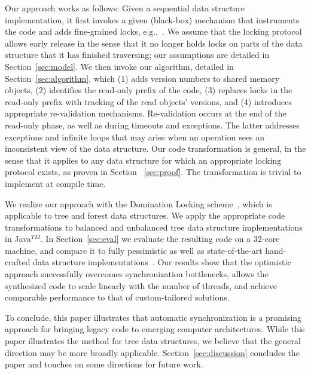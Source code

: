 Our approach works as follows: Given a sequential data structure implementation, 
it first invokes a given (black-box) mechanism that instruments the code and adds  
fine-grained locks, e.g.,~\cite{domination,tree-locking,dag}. We assume that the locking protocol 
allows early release in the sense that it no longer holds locks on parts of the data structure that it has finished traversing; 
our assumptions are detailed in Section~\ref{sec:model}. We then invoke our algorithm, detailed in Section~\ref{sec:algorithm}, which 
(1) adds version numbers to shared memory objects, 
(2) identifies the read-only prefix of the code, 
(3) replaces locks in the read-only prefix with tracking of the read objects' versions, and 
(4) introduces appropriate re-validation mechanisms.  
Re-validation occurs at the end of the read-only phase, as well as during timeouts and exceptions. 
The latter addresses exceptions and infinite loops that may arise when an operation sees an inconsistent view of the data structure. 
Our code transformation is general, in the sense that it applies to any data structure for which an appropriate locking protocol exists, 
as proven in Section ~\ref{sec:proof}. The transformation is trivial to implement at compile time.

We realize our approach with the Domination Locking scheme~\cite{domination}, 
which is applicable to tree and forest data structures. 
We apply the appropriate code transformations to balanced and unbalanced tree data structure implementations in Java$^{TM}$. 
In Section~\ref{sec:eval} we evaluate the resulting code on a 32-core machine, 
and compare it to fully pessimistic as well as state-of-the-art hand-crafted data structure implementations~\cite{dana,bronson}. 
Our results show that the optimistic approach successfully overcomes synchronization bottlenecks, 
allows the synthesized code to scale linearly with the number of threads, 
and achieve comparable performance to that of custom-tailored solutions.

To conclude, this paper illustrates that automatic synchronization is a promising approach for bringing legacy code to emerging computer architectures. 
While this paper illustrates the method for tree data structures, we believe that the general direction may be more broadly applicable.
Section~\ref{sec:discussion} concludes the paper and touches on some directions for future work.
